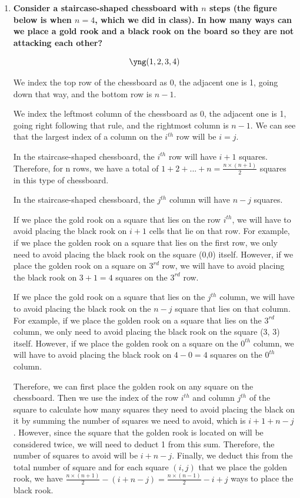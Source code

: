 \documentclass[10pt]{article}
\begin{document}
\begin{enumerate}
\begin{proof}
Therefore, there are a total of $90 + 81 + 72 + 8 + 9 + 1 = 261$ 4-digit numbers that have two consecutive 9's. The number of 4-digit numbers that do not have two consecutive 9's is $9000 - 261 = 8739$.
     
\end{proof}
\item
\textbf{Consider a staircase-shaped chessboard with $n$ steps (the figure below is when $n=4$, which we did in class).  In how many ways can we place a gold rook and a black rook on the board so they are not attacking each other?}

\Huge{$$\yng(1,2,3,4)$$}

\small

We index the top row of the chessboard as 0, the adjacent one is 1, going down that way, and the bottom row is $n - 1$. 

We index the leftmost column of the chessboard as 0, the adjacent one is 1, going right following that rule, and the rightmost column is $n - 1$. We can see that the largest index of a column on the $i^{th}$
row will be $i=j$.

In the staircase-shaped chessboard, the $i^{th}$ row will have $i + 1$ squares. Therefore, for n rows, we have a total of $1 + 2 + ... + n = \frac{n\times(n+1)}{2}$ squares in this type of chessboard.

In the staircase-shaped chessboard, the $j^{th}$ column will have $n - j$ squares.

If we place the gold rook on a square that lies on the row $i^{th}$, we will have to avoid placing the black rook on $i + 1$ cells that lie on that row. For example, if we place the golden rook on a square that lies on the first row, we only need to avoid placing the black rook on the square (0,0) itself. However, if we place the golden rook on a square on $3^{rd}$ row, we will have to avoid placing the black rook on $3 + 1 = 4$  squares on the $3^{rd}$ row.

If we place the gold rook on a square that lies on the $j^{th}$ column, we will have to avoid placing the black rook on the $n - j$ square that lies on that column. For example, if we place the golden rook on a square that lies on the $3^{rd}$ column, we only need to avoid placing the black rook on the square (3, 3) itself. However, if we place the golden rook on a square on the $0^ {th}$ column, we will have to avoid placing the black rook on $4 - 0 = 4$  squares on the $0^{th}$ column.

Therefore, we can first place the golden rook on any square on the chessboard. Then we use the index of the row $i^{th}$ and column $j^{th}$ of the square to calculate how many squares they need to avoid placing the black on it by summing the number of squares we need to avoid, which is $i + 1 + n - j$. However, since the square that the golden rook is located on will be considered twice, we will need to deduct 1 from this sum. Therefore, the number of squares to avoid will be $i + n - j$. Finally, we deduct this from the total number of square and for each square $(i,j)$ that we place the golden rook, we have $\frac{n\times(n+1)}{2} - (i + n - j) = \frac{n\times(n-1)}{2} - i + j$ ways to place the black rook.


\end{enumerate}
\end{document}
